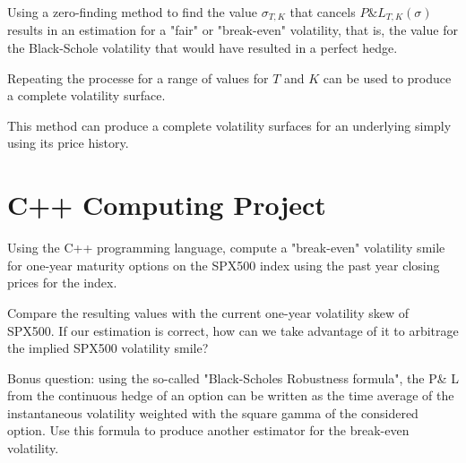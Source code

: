 \documentclass[a4paper]{article}
\newcommand{\1}{\textbf{1}}
\begin{document}
\par Using a zero-finding method to find the value $\sigma_{T, K}$ that cancels $P\text{\&}L_{T, K}(\sigma)$ results in an estimation for a "fair" or "break-even" volatility, that is, the value for the Black-Schole volatility that would have resulted in a perfect hedge.

\par Repeating the processe for a range of values for $T$ and $K$ can be used to produce a complete volatility surface.

\begin{breakbox}
This method can produce a complete volatility surfaces for an underlying simply using its price history.
\end{breakbox}

\section{C++ Computing Project}

\par Using the C++ programming language, compute a "break-even" volatility smile for one-year maturity options on the SPX500 index using the past year closing prices for the index.

\par Compare the resulting values with the current one-year volatility skew of SPX500. If our estimation is correct, how can we take advantage of it to arbitrage the implied SPX500 volatility smile?

\par Bonus question: using the so-called "Black-Scholes Robustness formula", the P\& L from the continuous hedge of an option can be written as the time average of the instantaneous volatility weighted with the square gamma of the considered option. Use this formula to produce another estimator for the break-even volatility.


\end{document}
